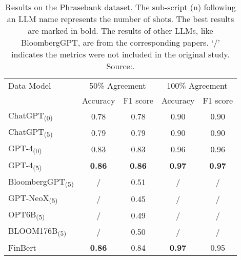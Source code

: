 \begin{table}[!h]
	\centering
	\begin{tabularx}{0.8\textwidth}{Xcccc}
		\toprule
		Data Model                      & \multicolumn{2}{c}{50\% Agreement} & \multicolumn{2}{c}{100\% Agreement}                                 \\
		                                & Accuracy                           & F1 score                            & Accuracy      & F1 score      \\
		\midrule
		ChatGPT\textsubscript{(0)}      & 0.78                               & 0.78                                & 0.90          & 0.90          \\
		ChatGPT\textsubscript{(5)}      & 0.79                               & 0.79                                & 0.90          & 0.90          \\
		GPT-4\textsubscript{(0)}        & 0.83                               & 0.83                                & 0.96          & 0.96          \\
		GPT-4\textsubscript{(5)}        & \textbf{0.86}                      & \textbf{0.86}                       & \textbf{0.97} & \textbf{0.97} \\
		BloombergGPT\textsubscript{(5)} & /                                  & 0.51                                & /             & /             \\
		GPT-NeoX\textsubscript{(5)}     & /                                  & 0.45                                & /             & /             \\
		OPT6B\textsubscript{(5)}        & /                                  & 0.49                                & /             & /             \\
		BLOOM176B\textsubscript{(5)}    & /                                  & 0.50                                & /             & /             \\
		FinBert                         & \textbf{0.86}                      & 0.84                                & \textbf{0.97} & 0.95          \\
		\bottomrule
	\end{tabularx}
	\caption{Results on the Phrasebank dataset. The sub-script (n) following an LLM name represents the number of shots. The best results are marked in bold. The results of other LLMs, like BloombergGPT, are from the corresponding papers. ‘/’ indicates the metrics were not included in the original study. Source:\protect\textcite{li2023chatgpt}.}
	\label{tab:finllm_comparison}
\end{table}
